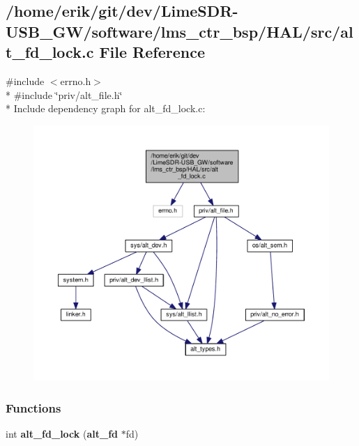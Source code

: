 \subsection{/home/erik/git/dev/\+Lime\+S\+D\+R-\/\+U\+S\+B\+\_\+\+G\+W/software/lms\+\_\+ctr\+\_\+bsp/\+H\+A\+L/src/alt\+\_\+fd\+\_\+lock.c File Reference}
\label{alt__fd__lock_8c}
{\ttfamily \#include $<$errno.\+h$>$}\\*
{\ttfamily \#include \char`\"{}priv/alt\+\_\+file.\+h\char`\"{}}\\*
Include dependency graph for alt\+\_\+fd\+\_\+lock.\+c\+:
\nopagebreak
\begin{figure}[H]
\begin{center}
\leavevmode
\includegraphics[width=350pt]{dd/d19/alt__fd__lock_8c__incl}
\end{center}
\end{figure}
\subsubsection*{Functions}
\begin{DoxyCompactItemize}
\item 
int {\bf alt\+\_\+fd\+\_\+lock} ({\bf alt\+\_\+fd} $\ast$fd)
\end{DoxyCompactItemize}


